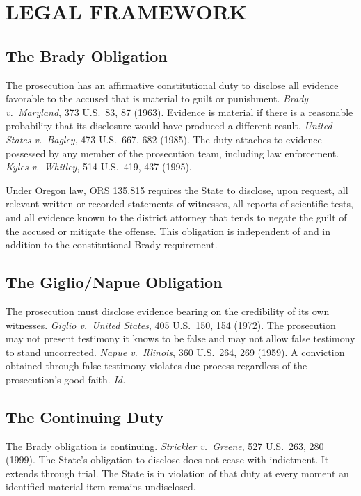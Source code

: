\documentclass[12pt,letterpaper]{extarticle}
\begin{document}
\section{LEGAL FRAMEWORK}

\subsection{The Brady Obligation}

The prosecution has an affirmative constitutional duty to disclose all evidence
favorable to the accused that is material to guilt or punishment. \textit{Brady v.\
Maryland}, 373 U.S.\ 83, 87 (1963). Evidence is material if there is a reasonable
probability that its disclosure would have produced a different result. \textit{United
States v.\ Bagley}, 473 U.S.\ 667, 682 (1985). The duty attaches to evidence
possessed by any member of the prosecution team, including law enforcement.
\textit{Kyles v.\ Whitley}, 514 U.S.\ 419, 437 (1995).

Under Oregon law, ORS 135.815 requires the State to disclose, upon request, all
relevant written or recorded statements of witnesses, all reports of scientific
tests, and all evidence known to the district attorney that tends to negate the
guilt of the accused or mitigate the offense. This obligation is independent of
and in addition to the constitutional Brady requirement.

\subsection{The Giglio/Napue Obligation}

The prosecution must disclose evidence bearing on the credibility of its own
witnesses. \textit{Giglio v.\ United States}, 405 U.S.\ 150, 154 (1972). The
prosecution may not present testimony it knows to be false and may not allow false
testimony to stand uncorrected. \textit{Napue v.\ Illinois}, 360 U.S.\ 264, 269
(1959). A conviction obtained through false testimony violates due process
regardless of the prosecution's good faith. \textit{Id.}

\subsection{The Continuing Duty}

The Brady obligation is continuing. \textit{Strickler v.\ Greene}, 527 U.S.\ 263,
280 (1999). The State's obligation to disclose does not cease with indictment. It
extends through trial. The State is in violation of that duty at every moment an
identified material item remains undisclosed.
\end{document}
